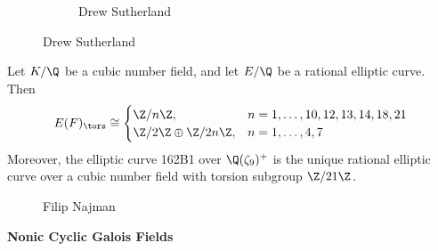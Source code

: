 \begin{frame}[plain]
\begin{figure}[h]
\begin{subfigure}{0.20\textwidth}
	\caption{{\scriptsize Drew Sutherland}}
	\end{subfigure}
	\end{figure}
\end{frame}



\begin{frame}[plain]
\begin{thm}[Najman]
Let $K/\Q$ be a cubic number field, and let $E/\Q$ be a rational elliptic curve. Then
	\[
	E(F)_\tors \cong
	\begin{cases}
	\Z/n\Z, & n=1,\ldots,10,12,13,14,18,21 \\
	\Z/2\Z \oplus \Z/2n\Z, & n=1,\ldots,4,7
	\end{cases}
	\]
Moreover, the elliptic curve 162B1 over $\Q(\zeta_9)^+$ is the unique rational elliptic curve over a cubic number field with torsion subgroup $\Z/21\Z$.
\end{thm}
	\begin{figure}
	\captionsetup{labelformat=empty}
	\centering
	\caption{\hspace{0.1cm}Filip Najman}
	\end{figure}
\end{frame}



\begin{frame}[plain]
\vfill
\begin{center} {\bfseries \Large \textcolor{UniGray}{Nonic Cyclic Galois Fields}} \end{center}
\vfill 
\end{frame}



